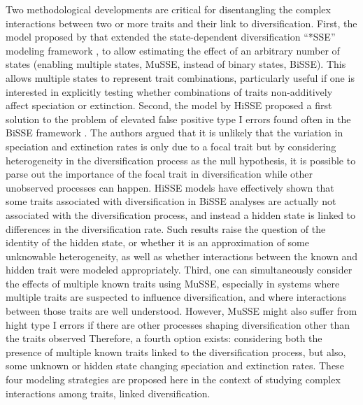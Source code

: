 Two methodological developments are critical for disentangling the complex interactions between two or more traits and their link to diversification.
First, the model proposed by \citet{fitzjohn_2012} that extended the state-dependent diversification ``*SSE'' modeling framework \citep{maddison_2007}, to allow estimating the effect of an arbitrary number of states (enabling multiple states, MuSSE, instead of binary states, BiSSE). 
This allows multiple states to represent trait combinations, particularly useful if one is interested in explicitly testing whether combinations of traits non-additively affect speciation or extinction. 
Second, the model by \citet{beaulieu_2016} HiSSE proposed a first solution to the problem of  elevated false positive type I errors found often in the BiSSE framework \citep{goldberg_2012}. The authors argued that it is unlikely that the variation in speciation and extinction rates is only due to a focal trait but by considering heterogeneity in the diversification process as the null hypothesis, it is possible to parse out the importance of the focal trait in diversification while other unobserved processes can happen. 
HiSSE models have effectively shown that some traits associated with diversification in BiSSE analyses are actually not associated with the diversification process, and instead a hidden state is linked to differences in the diversification rate.  
Such results raise the question of the identity of the hidden state, or whether it is an approximation of some unknowable heterogeneity, as well as whether interactions between the known and hidden trait were modeled appropriately. 
Third, one can simultaneously consider the effects of multiple known traits using MuSSE, especially in systems where multiple traits are suspected to influence diversification, and where interactions between those traits are well understood. 
However, MuSSE might also suffer from hight type I errors if there are other processes shaping diversification other than the traits observed \citep{caetano_2018}
Therefore, a fourth option exists: considering both the presence of multiple known traits  linked to the diversification process, but also, some unknown or hidden state changing speciation and extinction rates. 
These four modeling strategies are proposed here in the context of studying complex interactions among traits, linked diversification.

